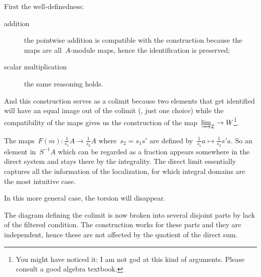 \begin{exercise} %
  First the well-definedness:
  \begin{description}
    \item[addition] the pointwise addition is compatible with the construction because the maps are all~$A$\nobreakdash-module maps, hence the identification is preserved;
    \item[scalar multiplication] the same reasoning holds.
  \end{description}

  And this construction serves as a colimit because two elements that get identified will have an equal image out of the colimit (\ie, just one choice) while the compatibility of the maps gives us the construction of the map~$\varinjlim_{\mathcal{I}}\to W$\footnote{You might have noticed it: I am not god at this kind of arguments. Please consult a good algebra textbook.}.
\end{exercise}

\begin{exercise}
  The maps~$F(m)\colon\frac{1}{s_1}A\to\frac{1}{s_2}A$ where~$s_2=s_1s'$ are defined by~$\frac{1}{s_1}a\mapsto\frac{1}{s_2}s'a$. So an element in~$S^{-1}A$ which can be regarded as a fraction appears somewhere in the direct system and stays there by the integrality. The direct limit essentially captures all the information of the localization, for which integral domains are the most intuitive case.

  In this more general case, the torsion will disappear.
\end{exercise}

\begin{exercise}
  The diagram defining the colimit is now broken into several disjoint parts by lack of the filtered condition. The construction works for these parts and they are independent, hence these are not affected by the quotient of the direct sum.
\end{exercise}
